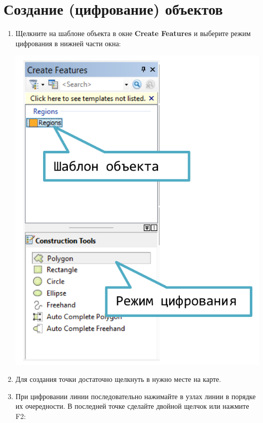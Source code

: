 \documentclass[12pt,]{book}
\begin{document}
\hypertarget{manual-edit-create}{%
\section{Создание (цифрование) объектов}\label{manual-edit-create}}

\begin{enumerate}
\def\labelenumi{\arabic{enumi}.}
\item
  Щелкните на шаблоне объекта в окне \textbf{Create Features} и выберите режим цифрования в нижней части окна:

  \includegraphics{images/Appendix/image91.png}
\item
  Для создания точки достаточно щелкнуть в нужно месте на карте.
\item
  При цифровании линии последовательно нажимайте в узлах линии в порядке их очередности. В последней точке сделайте двойной щелчок или нажмите F2:


\end{enumerate}
\end{document}
